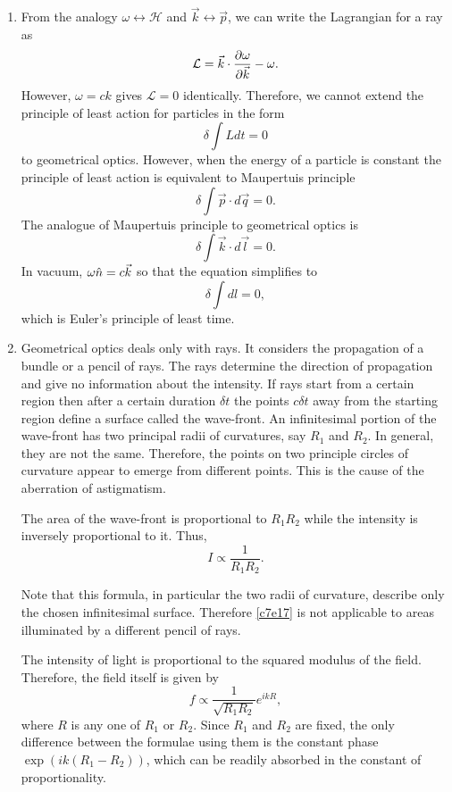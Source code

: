 \begin{enumerate}
\item From the analogy $\omega \leftrightarrow \mathcal{H}$ and $\vec{k} 
\leftrightarrow \vec{p}$, we can write the Lagrangian for a ray as
\[
\mathcal{L} = \vec{k}\cdot\frac{\partial{\omega}}{\partial{\vec{k}}} - \omega.
\]
However, $\omega = ck$ gives $\mathcal{L} = 0$ identically. Therefore, we cannot
extend the principle of least action for particles in the form
\[
\delta\int Ldt = 0
\]
to geometrical optics. However, when the energy of a particle is constant the
principle of least action is equivalent to Maupertuis principle
\[
\delta\int\vec{p}\cdot d\vec{q} = 0.
\]
The analogue of Maupertuis principle to geometrical optics is
\begin{equation}\label{c7e15}
\delta\int\vec{k}\cdot d\vec{l} = 0.
\end{equation}
In vacuum, $\omega\hat{n} = c\vec{k}$ so that the equation simplifies to
\begin{equation}\label{c7e16}
\delta\int dl = 0,
\end{equation}
which is Euler's principle of least time.

\item Geometrical optics deals only with rays. It considers the propagation of a
bundle or a pencil of rays. The rays determine the direction of propagation and 
give no information about the intensity. If rays start from a certain region then
after a certain duration $\delta t$ the points $c\delta t$ away from the starting
region define a surface called the wave-front. An infinitesimal portion of the
wave-front has two principal radii of curvatures, say $R_1$ and $R_2$. In general,
they are not the same. Therefore, the points on two principle circles of curvature
appear to emerge from different points. This is the cause of the aberration of
astigmatism.

The area of the wave-front is proportional to $R_1R_2$ while the intensity is
inversely proportional to it. Thus,
\begin{equation}\label{c7e17}
I \propto \frac{1}{R_1R_2}.
\end{equation}

Note that this formula, in particular the two radii of curvature, describe only 
the chosen infinitesimal surface. Therefore \eqref{c7e17} is not applicable to
areas illuminated by a different pencil of rays.

The intensity of light is proportional to the squared modulus of the field.
Therefore, the field itself is given by
\begin{equation}\label{c7e18}
f \propto \frac{1}{\sqrt{R_1R_2}} e^{ikR},
\end{equation}
where $R$ is any one of $R_1$ or $R_2$. Since $R_1$ and $R_2$ are fixed, the only
difference between the formulae using them is the constant phase $\exp(ik(R_1-R_2))$,
which can be readily absorbed in the constant of proportionality.


\end{enumerate}
